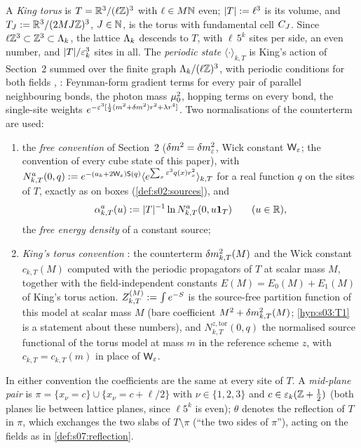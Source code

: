 \begin{definition}\label{def:s10:torus}
A \emph{King torus} is $T=\mathbb R^3/(\ell\mathbb Z)^3$ with $\ell\in M\mathbb N$ even; $|T|:=\ell^3$ is its volume, and $T_J:=\mathbb R^3/(2MJ\mathbb Z)^3$, $J\in\mathbb N$, is the torus with fundamental cell $C_J$. Since $\ell\mathbb Z^3\subset\mathbb Z^3\subset\Lambda_k$, the lattice $\Lambda_k$ descends to $T$, with $\ell\,5^k$ sites per side, an even number, and $|T|/\varepsilon_k^3$ sites in all. The \emph{periodic state} $\langle\cdot\rangle_{k,T}$ is King's action of Section~2 summed over the finite graph $\Lambda_k/(\ell\mathbb Z)^3$, with periodic conditions for both fields \cite[(4.1)]{K2}, \cite[(2.21)]{K1}: Feynman-form gradient terms for every pair of parallel neighbouring bonds, the photon mass $\mu_0^2$, hopping terms on every bond, the single-site weights $e^{-\varepsilon^3[\frac12(m^2+\delta m^2)r^2+\lambda r^4]}$. Two normalisations of the counterterm are used:
\begin{enumerate}[label=\textup{(\roman*)},nosep]
\item the \emph{free convention} of Section~2 ($\delta m^2=\delta m^2_{\varepsilon}$, Wick constant $\mathsf W_{\varepsilon}$; the convention of every cube state of this paper), with $N^a_{k,T}(0,q):= e^{-(a_k+2\mathsf W_{\varepsilon})\mathsf S(q)}\langle e^{\sum_x\varepsilon^3q(x)r_x^2}\rangle_{k,T}$ for a real function $q$ on the sites of $T$, exactly as on boxes (\cref{def:s02:sources}), and
\[
\alpha^a_{k,T}(u):=|T|^{-1}\ln N^a_{k,T}(0,u\mathbf 1_T)\qquad(u\in\mathbb R),
\]
the \emph{free energy density} of a constant source;
\item \emph{King's torus convention} \cite[(2.4), (3.33), (3.35)]{K1}: the counterterm $\delta m^2_{k,T}(M)$ and the Wick constant $c_{k,T}(M)$ computed with the periodic propagators of $T$ at scalar mass $M$, together with the field-independent constants $E(M)=E_0(M)+E_1(M)$ of King's torus action. $Z^{(M)}_{k,T}:=\int e^{-S}$ is the source-free partition function of this model at scalar mass $M$ (bare coefficient $M^2+\delta m^2_{k,T}(M)$; \cref{hyp:s03:T1} is a statement about these numbers), and $N^{z,\mathrm{tor}}_{k,T}(0,q)$ the normalised source functional of the torus model at mass $m$ in the reference scheme $z$, with $c_{k,T}=c_{k,T}(m)$ in place of $\mathsf W_{\varepsilon}$.
\end{enumerate}
In either convention the coefficients are the same at every site of $T$. A \emph{mid-plane pair} is $\pi=\{x_\nu=c\}\cup\{x_\nu=c+\ell/2\}$ with $\nu\in\{1,2,3\}$ and $c\in\varepsilon_k(\mathbb Z+\frac12)$ (both planes lie between lattice planes, since $\ell5^k$ is even); $\theta$ denotes the reflection of $T$ in $\pi$, which exchanges the two slabs of $T\setminus\pi$ (``the two sides of $\pi$''), acting on the fields as in \cref{def:s07:reflection}.
\end{definition}

